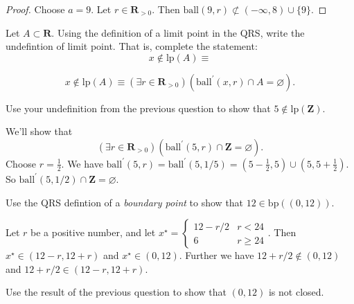 \documentclass[12pt, fleqn, answers]{exam}
\newcommand{\reals}{\mathbf{R}}
\newcommand{\integers}{\mathbf{Z}}
\newcommand{\bp}{\mathrm{bp}}
\newcommand{\lp}{\mathrm{lp}}
\newcommand{\ball}{\mathrm{ball}}
\begin{document}
\begin{questions}
\begin{solution}
\begin{proof}
Choose $a = 9$. Let $r \in \reals_{>0}$. Then $\ball(9,r) \not \subset (-\infty, 8) \cup \{9 \}$.
\end{proof}
\end{solution}
\question Let $A \subset \reals$.  Using the definition of a limit point in the QRS, write
the undefintion of limit point. That is, complete the statement:
\begin{equation*}
  x \not \in \lp(A) \equiv 
\end{equation*}

\begin{solution}
  \begin{equation*}
    x \not \in \lp(A) \equiv  \left(\exists r \in \reals_{>0} \right)
    \left(\ball^\prime(x,r) \cap A = \varnothing \right).
  \end{equation*}
\end{solution}
\question  Use your undefinition from the previous question to show that \(5 \notin  \lp (\integers)\).


\begin{solution}%
  We'll show that
  \begin{equation*}
  \left(\exists r \in \reals_{>0} \right)
  \left(\ball^\prime(5,r) \cap \integers = \varnothing \right).
  \end{equation*}
  Choose $r = \frac{1}{2}$. We have $\ball^\prime(5,r) = \ball^\prime(5,1/5) 
  = (5-\frac{1}{2}, 5) \cup (5, 5+\frac{1}{2})$. So $\ball^\prime(5,1/2)
  \cap \integers = \varnothing$.
  

\end{solution}

\question  Use the QRS defintion of a \emph{boundary point} to show that $12 \in \bp((0,12))$.


\begin{solution}%
Let \(r\) be a positive number, and let \(x^\star = \begin{cases} 12 - r/2 & r < 24 \\
                                                                      6  & r \geq 24 
\end{cases}\). Then \(x^\star \in (12-r, 12+ r)\) and \(x^\star \in (0,12)\). Further
we have \(12 + r /2 \notin (0,12)\) and \(12 + r/2 \in (12-r, 12+ r)\).

\end{solution}

\question  Use the result of the previous question to show that \((0,12)\) is not
closed.


\end{questions}
\end{document}
